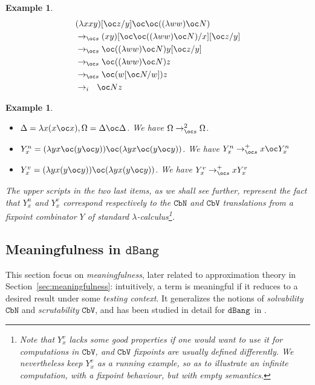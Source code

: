 \documentclass[10pt,a4paper]{article}
\newtheorem{example}[theorem]{Example}
\newcommand{\<}{\langle}
\renewcommand{\>}{\rangle}
\newcommand{\cbn}{\ensuremath{\mathtt{CbN}}}
\newcommand{\cbv}{\ensuremath{\mathtt{CbV}}}
\newcommand{\dbang}{\ensuremath{\mathtt{dBang}}}
\newcommand{\todbs}{\to_{\oc s}} %
\begin{document}
\begin{example}
	\begin{align*}
	&(\lambda x xy)[\oc z/y]\oc\oc((\lambda ww)\oc N) \\
	&\todbs (xy)[\oc\oc((\lambda ww)\oc N)/x][\oc z/y] \\
	&\todbs \oc((\lambda ww)\oc N)y[\oc z/y] \\
	&\todbs \oc((\lambda ww)\oc N)z \\
	&\todbs \oc(w[\oc N/w])z \\
	&\to_i \ \ \oc Nz
	\end{align*}
\end{example}

\begin{example}~\label{ex:terms}
	\begin{itemize}
		\item $\Delta=\lambda x (x\oc x), \Omega =\Delta\oc\Delta$. We
			have $\Omega\todbs^2 \Omega$.
		\item $Y^n_x=(\lambda y x\oc(y\oc y))\oc (\lambda y x\oc(y\oc
			y))$. We have $Y^n_x\todbs^+ x\oc Y^n_x$
		\item $Y^v_x=(\lambda y x(y\oc y))\oc (\lambda y x(y\oc y))$. We
			have $Y^v_x\todbs^+x Y^v_x$
	\end{itemize}
	The upper scripts in the two last items, as we shall see further,
	represent the fact that $Y^n_x$ and $Y^v_x$ correspond respectively to
	the \cbn{} and \cbv{} translations from a fixpoint combinator $Y$ of standard
	$\lambda$-calculus\footnote{
		Note that $Y^v_x$ lacks some good properties if one would want to use it for
		computations in \cbv{}, and \cbv{} fixpoints are usually defined differently. We
		nevertheless keep $Y^v_x$ as a running example, so as to illustrate an
		infinite computation, with a fixpoint behaviour, but with empty semantics.
	}.
\end{example}


\subsection{Meaningfulness in \dbang}

This section focus on \emph{meaningfulness}, later related to approximation theory in Section~\ref{sec:meaningfulness}: intuitively, a term is meaningful if it reduces to a desired result under some \emph{testing context}.
 It generalizes the notions of \emph{solvability} \cbn{} and \emph{scrutability} \cbv{}, and has been studied in detail for \dbang\
in \cite{kag24}.
\end{document}
